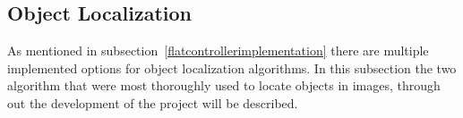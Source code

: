 \subsection{Object Localization}\label{solution:ObjectLocalization}
As mentioned in subsection~\ref{flatcontrollerimplementation} there are multiple implemented options for object localization algorithms.
In this subsection the two algorithm that were most thoroughly used to locate objects in images, through out the development of the project will be described.

